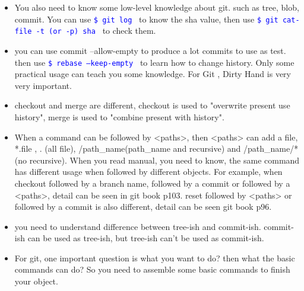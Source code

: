 \documentclass[a4paper,12pt,twoside]{book}
\newcommand{\linuxcommand}[1]{\texttt{\textcolor{blue}{\$ #1 \Pisymbol{psy}{191}}}}
\begin{document}
\begin{itemize}
 \item You also need to know some low-level knowledge about git. such as tree, blob,  commit. You can use \linuxcommand{git log } to know the sha value, then use \linuxcommand{git cat-file -t (or -p) sha} to check them. 
 
 
     
    \item you can use commit --allow-empty to produce a lot commits to use as test. then use
        \linuxcommand{rebase --keep-empty } to learn how to change history. Only some practical usage can
        teach you some knowledge. For Git , Dirty Hand is very very important.
        
        \item checkout and merge are different, checkout is used to "overwrite present use history", merge is used to "combine present with history".
        
         \item When a command can be followed by <paths>, then <paths> can add a file, *.file , . (all file),  /path\_name(path\_name and recursive) and /path\_name/*(no recursive).  When you read manual, you need to know, the same command has different usage when followed by different objects. For example, when checkout followed by a branch name, followed by a commit or followed by a <paths>, detail can be seen in git book p103.  reset followed by <paths> or followed by a commit is also different, detail can be seen git book p96. 
         \item you need to understand difference between tree-ish and commit-ish. commit-ish can be used as tree-ish, but tree-ish can't be used as commit-ish. 
        
     \item For git, one important question is what you want to do? then what the basic commands can do? So you need to assemble some basic commands to finish your object. 
     
    
     
\end{itemize}
\end{document}
